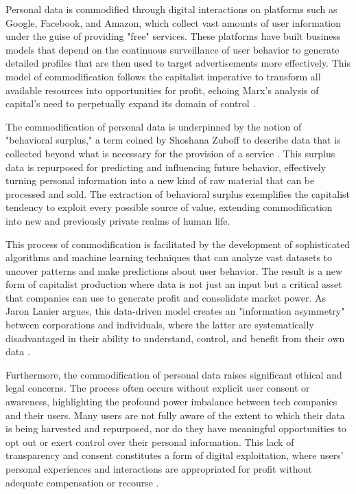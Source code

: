 Personal data is commodified through digital interactions on platforms such as Google, Facebook, and Amazon, which collect vast amounts of user information under the guise of providing "free" services. These platforms have built business models that depend on the continuous surveillance of user behavior to generate detailed profiles that are then used to target advertisements more effectively. This model of commodification follows the capitalist imperative to transform all available resources into opportunities for profit, echoing Marx's analysis of capital's need to perpetually expand its domain of control \cite[pp.~136-139]{marx2008capital}.

The commodification of personal data is underpinned by the notion of "behavioral surplus," a term coined by Shoshana Zuboff to describe data that is collected beyond what is necessary for the provision of a service \cite[pp.~86-88]{zuboff2020age}. This surplus data is repurposed for predicting and influencing future behavior, effectively turning personal information into a new kind of raw material that can be processed and sold. The extraction of behavioral surplus exemplifies the capitalist tendency to exploit every possible source of value, extending commodification into new and previously private realms of human life.

This process of commodification is facilitated by the development of sophisticated algorithms and machine learning techniques that can analyze vast datasets to uncover patterns and make predictions about user behavior. The result is a new form of capitalist production where data is not just an input but a critical asset that companies can use to generate profit and consolidate market power. As Jaron Lanier argues, this data-driven model creates an "information asymmetry" between corporations and individuals, where the latter are systematically disadvantaged in their ability to understand, control, and benefit from their own data \cite[pp.~29-31]{lanier2018ten}.

Furthermore, the commodification of personal data raises significant ethical and legal concerns. The process often occurs without explicit user consent or awareness, highlighting the profound power imbalance between tech companies and their users. Many users are not fully aware of the extent to which their data is being harvested and repurposed, nor do they have meaningful opportunities to opt out or exert control over their personal information. This lack of transparency and consent constitutes a form of digital exploitation, where users' personal experiences and interactions are appropriated for profit without adequate compensation or recourse \cite[pp.~150-152]{cohen2019between}.

